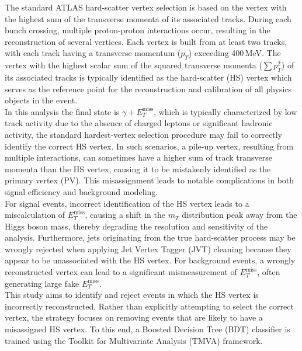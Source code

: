 The standard ATLAS hard-scatter vertex selection is based on the vertex with the highest sum of the transverse momenta of its associated tracks. During each bunch crossing, multiple proton-proton interactions occur, resulting in the reconstruction of several vertices. Each vertex is built from at least two tracks, with each track having a transverse momentum (\( p_T \)) exceeding 400\,MeV. The vertex with the highest scalar sum of the squared transverse momenta (\( \sum p_T^2 \)) of its associated tracks is typically identified as the hard-scatter (HS) vertex which serves as the reference point for the reconstruction and calibration of all physics objects in the event.\\
In this analysis the final state is \( \gamma + E_T^{\text{miss}} \), which is typically characterized by low track activity due to the absence of charged leptons or significant hadronic activity, the standard hardest-vertex selection procedure may fail to correctly identify the correct HS vertex. In such scenarios, a pile-up vertex, resulting from multiple interactions, can sometimes have a higher sum of track transverse momenta than the HS vertex, causing it to be mistakenly identified as the primary vertex (PV). This misassignment leads to notable complications in both signal efficiency and background modeling. \\
For signal events, incorrect identification of the HS vertex leads to a miscalculation of \( E_T^{\text{miss}} \), causing a shift in the \( m_T \) distribution peak away from the Higgs boson mass, thereby degrading the resolution and sensitivity of the analysis. Furthermore, jets originating from the true hard-scatter process may be wrongly rejected when applying Jet Vertex Tagger (JVT) cleaning because they appear to be unassociated with the HS vertex. For background events, a wrongly reconstructed vertex can lead to a significant mismeasurement of \( E_T^{\text{miss}} \), often generating large fake \( E_T^{\text{miss}} \).\\
This study aims to identify and reject events in which the HS vertex is incorrectly reconstructed. Rather than explicitly attempting to select the correct vertex, the strategy focuses on removing events that are likely to have a misassigned HS vertex. To this end, a Boosted Decision Tree (BDT) classifier is trained using the Toolkit for Multivariate Analysis (TMVA) framework.\\
